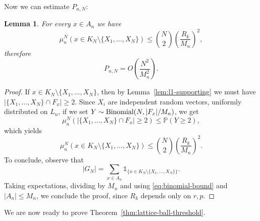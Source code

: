 \documentclass[11pt,a4paper]{article} %
\newtheorem{lemma}[theorem]{Lemma}
\theoremstyle{definition}
\theoremstyle{remark}
\newcommand{\1}{\mathds{1}}
\begin{document}
Now we can estimate $P_{n,N}$:

\begin{lemma}\label{lem:PnN-estimate}
For every $x \in A_n$ we have $$\mu_n^N (x \in K_N \setminus \{X_1,\ldots,X_N\}) \leq \binom{N}{2} \left(\frac{R_k}{M_n}\right)^2,$$ therefore $$P_{n,N} = O\left( \frac{N^2}{M_n^2}\right).$$ 
\end{lemma}

\begin{proof}
    If $x \in K_N \setminus \{X_1,\ldots,X_N\}$, then by Lemma~\ref{lem:l1-supporting} we must have $|\{X_1,\ldots,X_N\} \cap F_x| \geq 2$. Since $X_i$ are independent random vectors, uniformly distributed on $L_n$, if we set $Y \sim {\rm Binomial}(N,|F_x|/M_n)$, we get $$\mu_n^N(|\{X_1,\ldots,X_N\} \cap F_x| \geq 2) \leq \mathbb{P}(Y \geq 2),$$ which yields \begin{equation}\label{eq:binomial-bound}
    \mu_n^N(x \in K_N \setminus \{X_1,\ldots,X_N\}) \leq \binom{N}{2} \left(\frac{R_k}{M_n}\right)^2.\end{equation} To conclude, observe that $$|G_N|= \sum_{x \in A_n} \mathds{1}_{\{x \in K_N \setminus \{X_1,\ldots,X_N\} \}}.$$ Taking expectations, dividing by $M_n$ and using \eqref{eq:binomial-bound} and $|A_n| \leq M_n$, we conclude the proof, since $R_k$ depends only on $r,p$.
\end{proof}

We are now ready to prove Theorem~\ref{thm:lattice-ball-threshold}.
\end{document}

